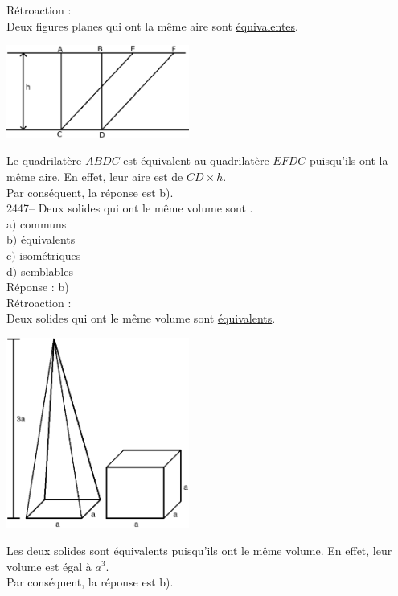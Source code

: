 \documentclass[letterpaper, 12pt]{article}
\begin{document}
R\'etroaction :\\
Deux figures planes qui ont la m\^eme aire sont \underline{\'equivalentes}.\\
\begin{center}
 \includegraphics[width=6cm,bb=0 536 571 842]{Q2446.eps}
\end{center}
Le quadrilat\`ere $ABDC$ est \'equivalent au quadrilat\`ere $EFDC$ puisqu'ils ont la m\^eme aire. En effet, leur aire est de $\overline{CD}\times h$.\\
Par cons\'equent, la r\'eponse est b).\\

2447-- Deux solides qui ont le m\^eme volume sont \underline{\qquad\qquad}.\\

a$)$ communs\\
b$)$ \'equivalents\\
c$)$ isom\'etriques\\
d$)$ semblables\\


R\'eponse : b)\\

R\'etroaction :\\
Deux solides qui ont le m\^eme volume sont \underline{\'equivalents}.\\
\begin{center}
 \includegraphics[width=6cm,bb=0 250 567 842]{Q2447r.eps}
\end{center}
Les deux solides sont \'equivalents puisqu'ils ont le m\^eme volume. En effet, leur volume est \'egal \`a $a^{3}$.\\
Par cons\'equent, la r\'eponse est b).\\
\end{document}

